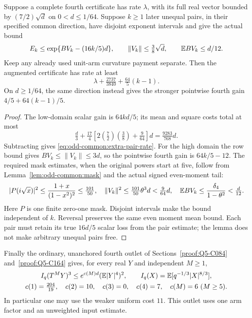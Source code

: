 \begin{lemma}
\label{lem:odd-common:extra-pairs}
Suppose a complete fourth certificate has rate \(\lambda\), with
its full real vector bounded by \((7/2)\sqrt d\) on
\(0<d\le1/64\). Suppose \(k\ge1\) later unequal pairs, in their
specified common direction, have disjoint exponent intervals and
give the actual bound
\[
 E_k\le\exp\{BV_k-(16k/5)d\},\qquad
 \|V_k\|\le\tfrac38\sqrt d,\qquad \mathbb E BV_k\le d/12.
\]
Keep any already used unit-arm curvature payment separate.
Then the augmented certificate has rate at least
\begin{equation}\label{eq:odd-common:extra-pair-rate}
 \lambda+\tfrac{2737}{3840}+\tfrac{64}{5}(k-1).
\end{equation}
On \(d\ge1/64\), the same direction instead gives the stronger
pointwise fourth gain \(4/5+64(k-1)/5\).
\end{lemma}
\begin{proof}
The low-domain scalar gain is \(64kd/5\); its mean and square
costs total at most
\[
 \tfrac d3+\tfrac{17}{4}
       [2(\tfrac72)(\tfrac38)+\tfrac9{64}]d
   =\tfrac{9283}{768}d.
\]
Subtracting gives \eqref{eq:odd-common:extra-pair-rate}.
For the high domain the row bound gives
\(BV_k\le\|V_k\|\le3d\), so the pointwise fourth gain is
\(64k/5-12\).
The required mask estimates, when the original powers start at five,
follow from Lemma~\ref{lem:odd-common:mask} and the actual signed
even-moment tail:
\[
 |P(i\sqrt x)|^2\le\frac{1+x}{(1-x^2)^2}\le\tfrac{101}{50},
 \quad\|V_k\|^2\le\tfrac{101}{50}\theta^3d<\tfrac9{64}d,
 \quad\mathbb E BV_k\le\frac{\delta_4}{1-\theta^2}<\tfrac d{12}.
\]
Here \(P\) is one finite zero-one mask. Disjoint intervals make
the bound independent of \(k\). Reversal preserves the same even
moment mean bound. Each pair must retain its true \(16d/5\)
scalar loss from the pair estimate; the lemma does not make
arbitrary unequal pairs free.
\end{proof}

Finally the ordinary, unanchored fourth outlet of
Sections~\ref{proof:Q5-C084} and~\ref{proof:Q5-C164} gives, for every
real \(Y\) and independent \(M\ge1\),
\begin{equation}\label{eq:odd-common:outlet}
\begin{gathered}
 I_q(T^MY)^3\le e^{c(M)d}(\mathbb E|Y|^4)^2,
 \qquad I_q(X)=\mathbb E[q^{-1/3}|X|^{8/3}],\\
 c(1)=\tfrac{204}{19},\quad c(2)=10,\quad c(3)=0,
 \quad c(4)=7,\quad c(M)=6\ (M\ge5).
\end{gathered}
\end{equation}
In particular one may use the weaker uniform cost \(11\).
This outlet uses one arm factor and an unweighted input estimate.
